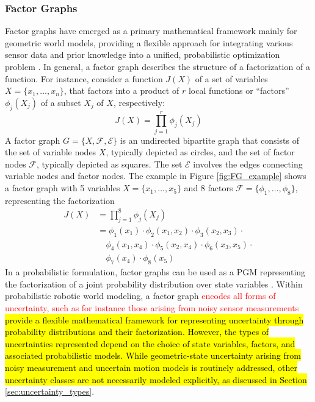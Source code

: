 \subsubsection{Factor Graphs}\label{sec:background_factor_graphs}
Factor graphs have emerged as a primary mathematical framework mainly for geometric world models, providing a flexible approach for integrating various sensor data and prior knowledge into a unified, probabilistic optimization problem\cite{deeb_model-based_2019} \cite{gulati_robust_2017}. In general, a factor graph describes the structure of a factorization of a function. For instance, 
consider a function $J(X)$ of a set of variables $X = \{x_1, \ldots , x_n\}$, that factors into a product of $r$ local functions or ``factors'' $\phi_j(X_j)$ of a subset $X_j$ of $X$, respectively:
\begin{equation}
J(X) = \prod_{j=1}^{r} \phi_j(X_j)
\end{equation}
A factor graph $G = \{X,\mathcal{F},\mathcal{E}\}$ is an undirected bipartite graph that consists of  the set of variable nodes $X$, typically depicted as circles, and the set of factor nodes $\mathcal{F}$, typically depicted as squares. The set $\mathcal{E}$ involves the edges connecting variable nodes and factor nodes. The example in Figure \ref{fig:FG_example} shows a factor graph with
5 variables $X = \{x_1, \ldots, x_5 \}$ and 8 factors $\mathcal{F}=\{\phi_1, \ldots, \phi_8 \}$,  representing the factorization 
\begin{equation}
\begin{aligned}
    J(X) &= \prod_{j=1}^{8} \phi_j(X_j) \\
    &= \phi_1(x_1)\cdot\phi_2(x_1,x_2) \cdot \phi_3(x_2,x_3) \cdot \\
    & \quad \phi_4(x_1,x_4) \cdot \phi_5(x_2,x_4) \cdot \phi_6(x_3,x_5) \cdot \\
    & \quad \phi_7(x_4) \cdot \phi_8(x_5)
    \end{aligned}
\end{equation}
In a probabilistic formulation, factor graphs can be used as a PGM representing the factorization of a joint probability distribution over state variables \cite{gulati_robust_2017}. 
Within probabilistic robotic world modeling, a factor graph \textcolor{red}{encodes all forms of uncertainty, such as for instance those arising from noisy sensor measurements} \hl{provide a flexible mathematical framework for representing uncertainty through probability distributions and their factorization. However, the types of uncertainties represented depend on the choice of state variables, factors, and associated probabilistic models. While geometric-state uncertainty arising from noisy measurement and uncertain motion models is routinely addressed, other uncertainty classes are not necessarily modeled explicitly, as discussed in Section} \ref{sec:uncertainty_types}. 
